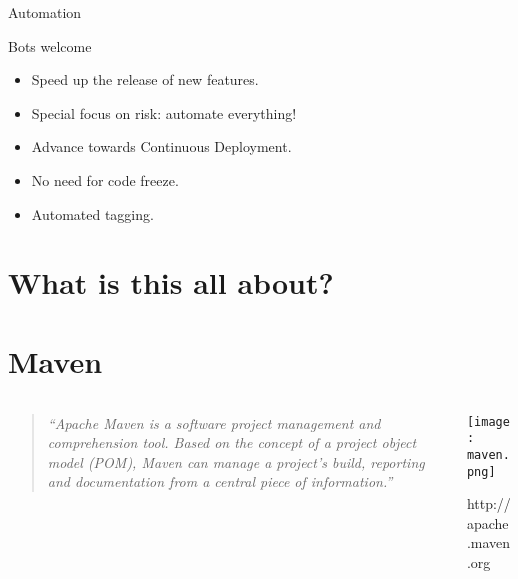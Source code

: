 \documentclass[presentation]{beamer}
\begin{document}
{
\begin{frame}[label=sec-3-3]{Automation}

\begin{block}{Bots welcome}

\begin{itemize}
\item Speed up the release of new features.
\item Special focus on risk: automate everything!
\item Advance towards Continuous Deployment.
\item No need for code freeze.
\item Automated tagging.
\end{itemize}
\end{block}
\end{frame}
} %

\section{What is this all about?}
\label{sec-4}

\section{Maven}
\label{sec-5}

{
\begin{frame}[label=sec-5-1]{}

\begin{columns}
\begin{column}{0.6\textwidth}
\begin{quotation} %

\textit{``Apache Maven is a software project management and comprehension tool. Based on the concept of a project object model (POM), Maven can manage a project's build, reporting and documentation from a central piece of information.''}
\end{quotation}
\end{column}

\begin{column}{0.4\textwidth}
\texttt{[image: maven.png]}

\small{http://apache.maven.org}
\end{column}
\end{columns}
\end{frame}
} %
\end{document}
